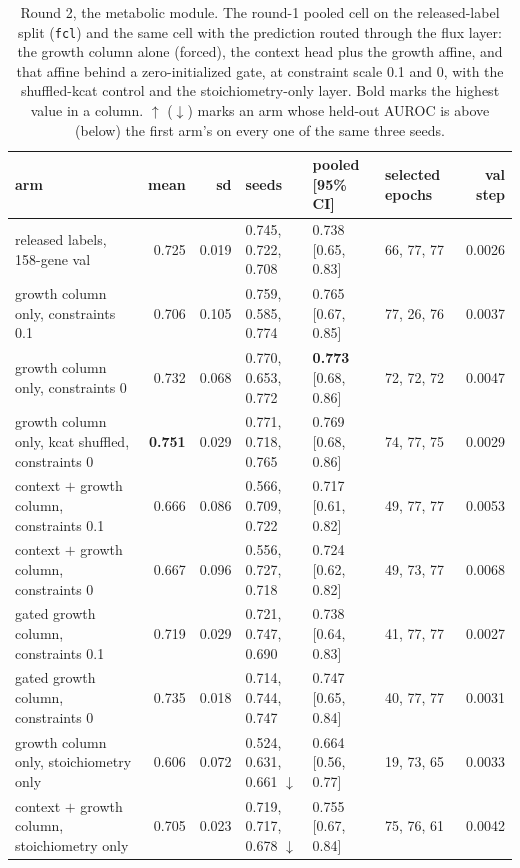 \begin{table}[H]
  \centering
  \footnotesize
  \caption[Round 2, the metabolic module]{Round 2, the metabolic module. The round-1 pooled cell on the released-label split (\texttt{fcl}) and the same cell with the prediction routed through the flux layer: the growth column alone (forced), the context head plus the growth affine, and that affine behind a zero-initialized gate, at constraint scale 0.1 and 0, with the shuffled-kcat control and the stoichiometry-only layer. Bold marks the highest value in a column. $\uparrow$ ($\downarrow$) marks an arm whose held-out AUROC is above (below) the first arm's on every one of the same three seeds.}
  \label{tab:w13}
  \begin{tabular}{@{}p{52mm}rrlllr@{}}
    \hline
    arm & mean & sd & seeds & pooled [95\% CI] & selected epochs & val step \\
    \hline
    released labels, 158-gene val & 0.725 & 0.019 & 0.745, 0.722, 0.708 & 0.738 [0.65, 0.83] & 66, 77, 77 & 0.0026 \\
    growth column only, constraints 0.1 & 0.706 & 0.105 & 0.759, 0.585, 0.774 & 0.765 [0.67, 0.85] & 77, 26, 76 & 0.0037 \\
    growth column only, constraints 0 & 0.732 & 0.068 & 0.770, 0.653, 0.772 & \textbf{0.773} [0.68, 0.86] & 72, 72, 72 & 0.0047 \\
    growth column only, kcat shuffled, constraints 0 & \textbf{0.751} & 0.029 & 0.771, 0.718, 0.765 & 0.769 [0.68, 0.86] & 74, 77, 75 & 0.0029 \\
    context $+$ growth column, constraints 0.1 & 0.666 & 0.086 & 0.566, 0.709, 0.722 & 0.717 [0.61, 0.82] & 49, 77, 77 & 0.0053 \\
    context $+$ growth column, constraints 0 & 0.667 & 0.096 & 0.556, 0.727, 0.718 & 0.724 [0.62, 0.82] & 49, 73, 77 & 0.0068 \\
    gated growth column, constraints 0.1 & 0.719 & 0.029 & 0.721, 0.747, 0.690 & 0.738 [0.64, 0.83] & 41, 77, 77 & 0.0027 \\
    gated growth column, constraints 0 & 0.735 & 0.018 & 0.714, 0.744, 0.747 & 0.747 [0.65, 0.84] & 40, 77, 77 & 0.0031 \\
    growth column only, stoichiometry only & 0.606 & 0.072 & 0.524, 0.631, 0.661 $\downarrow$ & 0.664 [0.56, 0.77] & 19, 73, 65 & 0.0033 \\
    context $+$ growth column, stoichiometry only & 0.705 & 0.023 & 0.719, 0.717, 0.678 $\downarrow$ & 0.755 [0.67, 0.84] & 75, 76, 61 & 0.0042 \\
    \hline
  \end{tabular}
\end{table}
